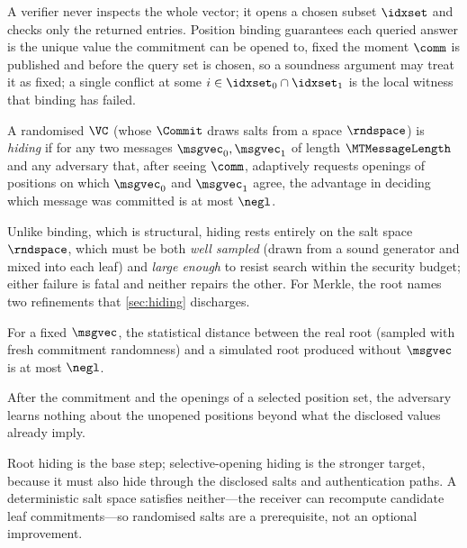 A verifier never inspects the whole vector; it opens a chosen subset $\idxset$
and checks only the returned entries.  Position binding guarantees each queried
answer is the unique value the commitment can be opened to, fixed the moment
$\comm$ is published and before the query set is chosen, so a soundness argument
may treat it as fixed; a single conflict at some $i\in\idxset_0\cap\idxset_1$ is
the local witness that binding has failed.

\begin{definition}[Hiding]\label{def:vc-hiding}
A randomised $\VC$ (whose $\Commit$ draws salts from a space $\rndspace$) is
\emph{hiding} if for any two messages $\msgvec_0,\msgvec_1$ of length
$\MTMessageLength$ and any adversary that, after seeing $\comm$, adaptively
requests openings of positions on which $\msgvec_0$ and $\msgvec_1$ agree, the
advantage in deciding which message was committed is at most $\negl$.
\end{definition}

Unlike binding, which is structural, hiding rests entirely on the salt space
$\rndspace$, which must be both \emph{well sampled} (drawn from a sound
generator and mixed into each leaf) and \emph{large enough} to resist search
within the security budget; either failure is fatal and neither repairs the
other.  For Merkle, the root names two refinements that \cref{sec:hiding}
discharges.

\begin{definition}\label{def:root-hiding}
For a fixed $\msgvec$, the statistical distance between the real root (sampled
with fresh commitment randomness) and a simulated root produced without
$\msgvec$ is at most $\negl$.
\end{definition}

\begin{definition}\label{def:selective-hiding}
After the commitment and the openings of a selected position set, the adversary
learns nothing about the unopened positions beyond what the disclosed values
already imply.
\end{definition}

Root hiding is the base step; selective-opening hiding is the stronger target,
because it must also hide through the disclosed salts and authentication paths.
A deterministic salt space satisfies neither---the receiver can recompute
candidate leaf commitments---so randomised salts are a prerequisite, not an
optional improvement.

